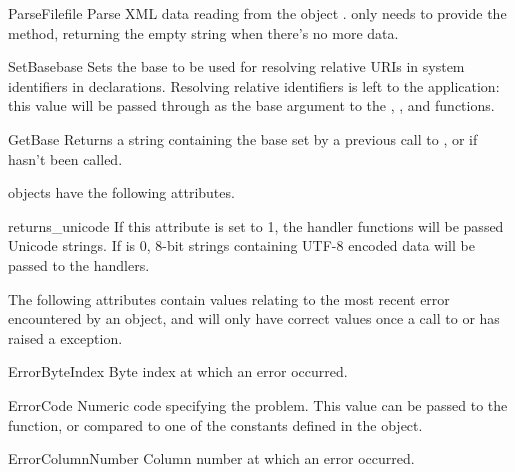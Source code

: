 \begin{methoddesc}{ParseFile}{file}
Parse XML data reading from the object .   only
needs to provide the  method, returning the
empty string when there's no more data.
\end{methoddesc}

\begin{methoddesc}{SetBase}{base}
Sets the base to be used for resolving relative URIs in system identifiers in
declarations.  Resolving relative identifiers is left to the application:
this value will be passed through as the base argument to the
, ,
and  functions. 
\end{methoddesc}

\begin{methoddesc}{GetBase}{}
Returns a string containing the base set by a previous call to
, or  if 
 hasn't been called.
\end{methoddesc}

 objects have the following attributes.  

\begin{datadesc}{returns_unicode} 
If this attribute is set to 1, the handler functions will be passed
Unicode strings.  If  is 0, 8-bit strings
containing UTF-8 encoded data will be passed to the handlers.
\end{datadesc} 

The following attributes contain values relating to the most recent
error encountered by an  object, and will only have
correct values once a call to  or 
has raised a  exception.

\begin{datadesc}{ErrorByteIndex} 
Byte index at which an error occurred.
\end{datadesc} 

\begin{datadesc}{ErrorCode} 
Numeric code specifying the problem.  This value can be passed to the
 function, or compared to one of the constants
defined in the  object.
\end{datadesc}

\begin{datadesc}{ErrorColumnNumber} 
Column number at which an error occurred.
\end{datadesc}

